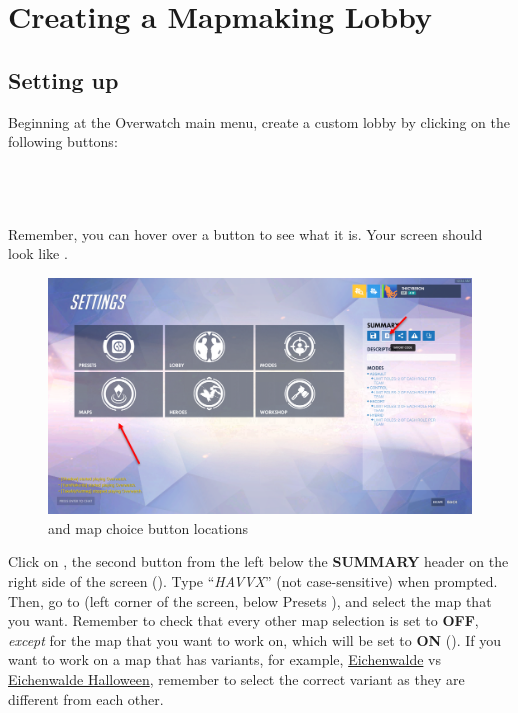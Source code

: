 \documentclass[12pt,a4paper]{article}
\begin{document}
\newpage
\section{Creating a Mapmaking Lobby}
    
    \subsection{Setting up}
        Beginning at the Overwatch main menu, create a custom lobby by clicking on the following buttons:\\ \\
        \centerline{}\\ \\
        Remember, you can hover over a button to see what it is.
        Your screen should look like .
    
        \begin{figure}[ht]
            \centering
            \includegraphics[width=\textwidth,height=\textheight,keepaspectratio]{Picture1.png}
            \caption{ and map choice button locations}
            \label{fig:Picture1}
        \end{figure}
    
        Click on , the second button from the left below the \textbf{SUMMARY} header on the right side of the screen (). Type ``\textit{HAVVX}'' (not case-sensitive) when prompted. Then, go to  (left corner of the screen, below Presets ), and select the map that you want. Remember to check that every other map selection is set to \textbf{OFF}, \emph{except} for the map that you want to work on, which will be set to \textbf{ON} (). If you want to work on a map that has variants, for example, \underline{Eichenwalde} vs \underline{Eichenwalde Halloween}, remember to select the correct variant as they are different from each other.
        
\end{document}
